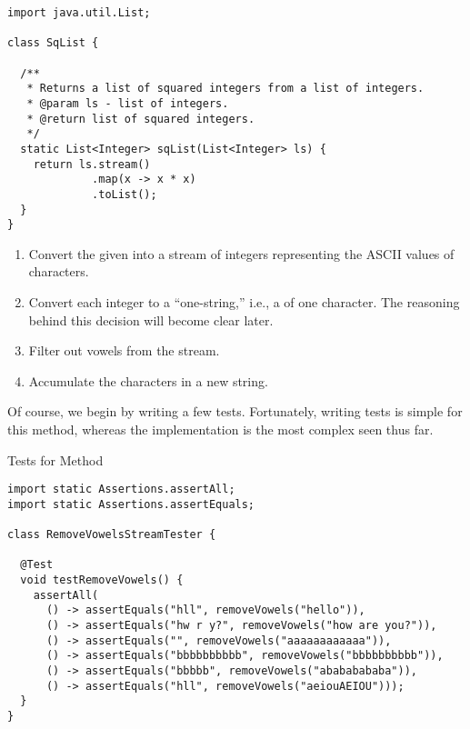 \begin{cl}[]{}
\begin{lstlisting}[language=MyJava]
import java.util.List;

class SqList {

  /**
   * Returns a list of squared integers from a list of integers.
   * @param ls - list of integers.
   * @return list of squared integers.
   */
  static List<Integer> sqList(List<Integer> ls) {
    return ls.stream()
             .map(x -> x * x)
             .toList();
  }
}
\end{lstlisting}    
\end{cl}


\begin{enumerate}
    \item Convert the given  into a stream of integers representing the ASCII values of characters.
    \item Convert each integer to a ``one-string,'' i.e., a  of one character. The reasoning behind this decision will become clear later.
    \item Filter out vowels from the stream.
    \item Accumulate the characters in a new string.
\end{enumerate}

Of course, we begin by writing a few tests. Fortunately, writing tests is simple for this method, whereas the implementation is the most complex seen thus far.

\begin{cl}[]{Tests for  Method}
\begin{lstlisting}[language=MyJava]
import static Assertions.assertAll;
import static Assertions.assertEquals;

class RemoveVowelsStreamTester {
  
  @Test
  void testRemoveVowels() {
    assertAll(
      () -> assertEquals("hll", removeVowels("hello")),
      () -> assertEquals("hw r y?", removeVowels("how are you?")),
      () -> assertEquals("", removeVowels("aaaaaaaaaaaa")),
      () -> assertEquals("bbbbbbbbbb", removeVowels("bbbbbbbbbb")),
      () -> assertEquals("bbbbb", removeVowels("abababababa")),
      () -> assertEquals("hll", removeVowels("aeiouAEIOU")));
  }
}
\end{lstlisting}
\end{cl}

